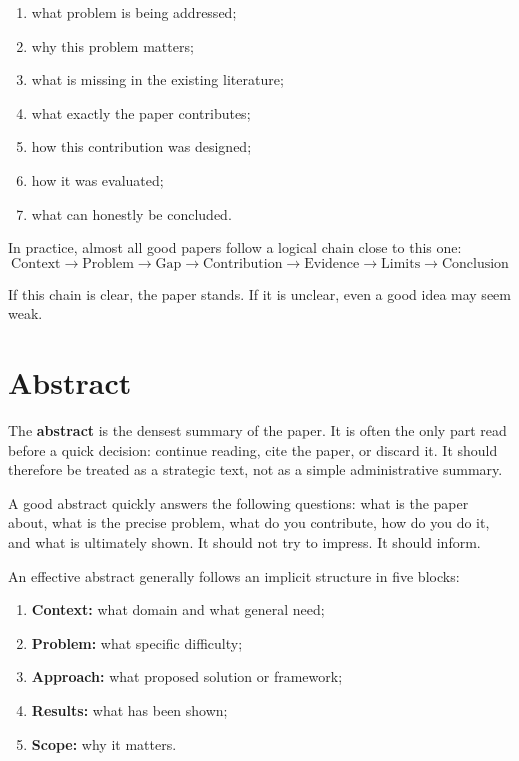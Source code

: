 \documentclass[11pt,a4paper]{article}
\theoremstyle{definition}
\begin{document}
\begin{enumerate}[label=\arabic*.]
    \item what problem is being addressed;
    \item why this problem matters;
    \item what is missing in the existing literature;
    \item what exactly the paper contributes;
    \item how this contribution was designed;
    \item how it was evaluated;
    \item what can honestly be concluded.
\end{enumerate}

In practice, almost all good papers follow a logical chain close to this one:
\[
\text{Context} \rightarrow \text{Problem} \rightarrow \text{Gap} \rightarrow \text{Contribution} \rightarrow \text{Evidence} \rightarrow \text{Limits} \rightarrow \text{Conclusion}
\]

If this chain is clear, the paper stands. If it is unclear, even a good idea may seem weak.

\section{Abstract}

The \textbf{abstract} is the densest summary of the paper. It is often the only part read before a quick decision: continue reading, cite the paper, or discard it. It should therefore be treated as a strategic text, not as a simple administrative summary.

A good abstract quickly answers the following questions: what is the paper about, what is the precise problem, what do you contribute, how do you do it, and what is ultimately shown. It should not try to impress. It should inform.

An effective abstract generally follows an implicit structure in five blocks:
\begin{enumerate}[label=\arabic*.]
    \item \textbf{Context:} what domain and what general need;
    \item \textbf{Problem:} what specific difficulty;
    \item \textbf{Approach:} what proposed solution or framework;
    \item \textbf{Results:} what has been shown;
    \item \textbf{Scope:} why it matters.
\end{enumerate}
\end{document}
